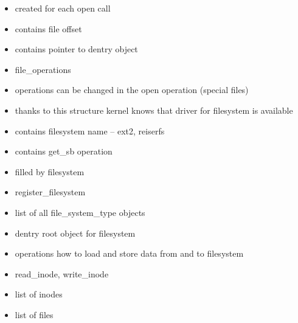 \documentclass[30pt,a4paper,landscape,headrule,footrule]{foils}
\begin{document}
\begin{itemize}
\item created for each open call
\item contains file offset
\item contains pointer to dentry object
\item file\_operations
\item operations can be changed in the open operation (special files)
\end{itemize}


\begin{itemize}
\item thanks to this structure kernel knows that driver for filesystem is
available
\item contains filesystem name -- ext2, reiserfs
\item contains get\_sb operation
\item filled by filesystem
\item register\_filesystem
\item list of all file\_system\_type objects
\end{itemize}

\begin{itemize}
\item dentry root object for filesystem
\item operations how to load and store data from and to filesystem
\item read\_inode, write\_inode
\item list of inodes
\item list of files
\end{itemize}
\end{document}
